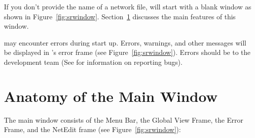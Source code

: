 If you don't provide the name of a network file, \sr{} will start with
a blank window as shown in Figure~\ref{fig:srwindow}.
Section~\ref{sec:windowanatomy} discusses the main features of this
window.

\sr{} may encounter errors during start up.  Errors, warnings, and
other messages will be displayed in
\sr{}'s error frame (see Figure~\ref{fig:srwindow}).   Errors
should be  to the \sr{} development
team (See  for information on
reporting bugs).

\section{Anatomy of the Main Window}
\label{sec:windowanatomy}

The \sr{} main window consists of the Menu Bar, the Global View Frame,
the Error Frame, and the NetEdit frame (see
Figure~\ref{fig:srwindow}):

